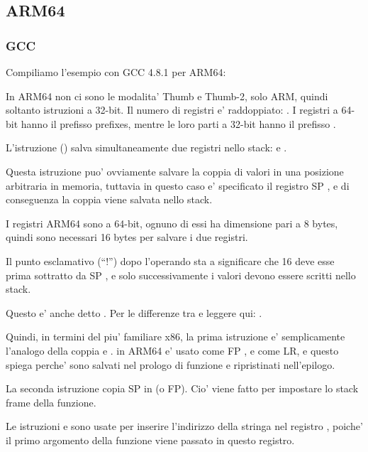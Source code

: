 \subsection{ARM64}

\subsubsection{GCC}

Compiliamo l'esempio con GCC 4.8.1 per ARM64:



In ARM64 non ci sono le modalita' Thumb e Thumb-2, solo ARM, quindi soltanto istruzioni a 32-bit.
Il numero di registri e' raddoppiato: .
I registri a 64-bit hanno il prefisso  prefixes, mentre le loro parti a 32-bit hanno il prefisso \EMDASH{}.

L'istruzione  () 
salva simultaneamente due registri nello stack:  e .

Questa istruzione puo' ovviamente salvare la coppia di valori in una posizione arbitraria in memoria, tuttavia in questo caso e'
specificato il registro \ac{SP} , e di conseguenza la coppia viene salvata nello stack.

I registri ARM64 sono a 64-bit, ognuno di essi ha dimensione pari a 8 bytes, quindi sono necessari 16 bytes per salvare i due registri.

Il punto esclamativo (``!'') dopo l'operando sta a significare che 16 deve esse prima sottratto da \ac{SP} , e solo successivamente
i valori devono essere scritti nello stack.

Questo e' anche detto .
Per le differenze tra  e  
leggere qui: .

Quindi, in termini del piu' familiare x86, la prima istruzione e' semplicamente l'analogo della coppia
 e .
 in ARM64 e' usato come \ac{FP} , e  
come \ac{LR}, e questo spiega perche' sono salvati nel prologo di funzione e ripristinati nell'epilogo.

La seconda istruzione copia \ac{SP} in  (o \ac{FP}).
Cio' viene fatto per impostare lo stack frame della funzione.

\label{pointers_ADRP_and_ADD}
Le istruzioni  e \ADD sono usate per inserire
l'indirizzo della stringa  nel registro  , 
poiche' il primo argomento della funzione viene passato in questo registro.

